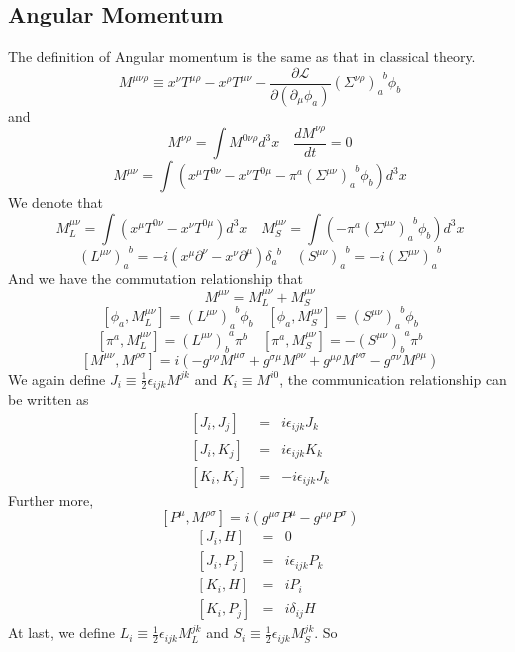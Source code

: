 \documentclass{article}
\begin{document}
\subsection{Angular Momentum}
The definition of Angular momentum is the same as that in classical theory.
\[M^{\mu \nu \rho} \equiv x^{\nu}T^{\mu \rho} - x^{\rho} T^{\mu \nu} - \frac{\partial \mathcal{L}}{\partial (\partial_{\mu}\phi_a)}(\Sigma^{\nu \rho})_{a}^{\phantom{a}b}\phi_b\]
and 
\[M^{\nu \rho} = \int M^{0 \nu \rho} d^3 x \quad \frac{dM^{\nu \rho}}{dt} = 0\]
\[M^{\mu \nu} = \int (x^{\mu}T^{0\nu}-x^{\nu}T^{0\mu}-\pi^a(\Sigma^{\mu \nu})_{a}^{\phantom{a}b}\phi_b) d^3 x\]
We denote that
\[M_{L}^{\mu \nu} = \int (x^{\mu}T^{0\nu}-x^{\nu}T^{0\mu}) d^3 x \quad M_S^{\mu \nu} = \int (-\pi^a(\Sigma^{\mu \nu})_{a}^{\phantom{a}b}\phi_b) d^3 x\]
\[(L^{\mu \nu})_a^{\phantom{a}b} = -i(x^{\mu}\partial^{\nu}-x^{\nu}\partial^{\mu})\delta_a^{\phantom{a}b} \quad (S^{\mu \nu})_a^{\phantom{a}b} = -i(\Sigma^{\mu \nu})_a^{\phantom{a}b}\]
And we have the commutation relationship that
\[M^{\mu \nu} = M_L^{\mu \nu} + M_S^{\mu \nu}\]
\[[\phi_a,M_L^{\mu \nu}] = (L^{\mu \nu})_a^{\phantom{a}b} \phi_b \quad [\phi_a,M_S^{\mu \nu}] = (S^{\mu \nu})_a^{\phantom{a}b} \phi_b\]
\[[\pi^a,M_L^{\mu \nu}] = (L^{\mu \nu})_b^{\phantom{b}a}\pi^{b}  \quad [\pi^a,M_S^{\mu \nu}] = - (S^{\mu \nu})_b^{\phantom{b}a} \pi^b \]
\[[M^{\mu \nu},M^{\rho \sigma}] = i(-g^{\nu \rho}M^{\mu \sigma} + g^{\sigma \mu}M^{\rho \nu} + g^{\mu \rho}M^{\nu \sigma} - g^{\sigma \nu}M^{\rho \mu})\]
We again define $J_i \equiv \frac{1}{2} \epsilon_{ijk} M^{jk}$ and $K_i \equiv M^{i0}$, the communication relationship can be written as
\begin{eqnarray}
\left[J_i,J_j\right] &=& i\epsilon_{ijk}J_k \nonumber \\
\left[J_i,K_j\right] &=& i\epsilon_{ijk}K_k \nonumber \\
\left[K_i,K_j\right] &=& -i\epsilon_{ijk}J_k \nonumber
\end{eqnarray}
Further more, 
\[[P^{\mu},M^{\rho \sigma}] = i(g^{\mu \sigma}P^{\mu} - g^{\mu \rho}P^{\sigma})\]
\begin{eqnarray}
\left[J_i,H\right] &=& 0 \nonumber \\
\left[J_i,P_j\right] &=& i\epsilon_{ijk}P_k \nonumber \\
\left[K_i,H\right] &=& iP_i \nonumber \\
\left[K_i,P_j\right] &=& i\delta_{ij}H \nonumber
\end{eqnarray}
At last, we define $L_i \equiv \frac{1}{2} \epsilon_{ijk} M_L^{jk}$ and $S_i \equiv \frac{1}{2} \epsilon_{ijk} M_S^{jk}$. So
\end{document}
